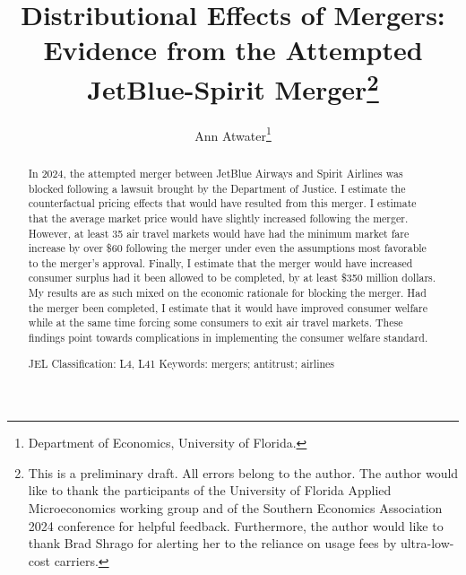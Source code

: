 \documentclass{article}
\author{Ann Atwater\footnote{Department of Economics, University of Florida.}}
\title{Distributional Effects of Mergers: Evidence from the Attempted JetBlue-Spirit Merger\footnote{This is a preliminary draft. All errors belong to the author. The author would like to thank the participants of the University of Florida Applied Microeconomics working group and of the Southern Economics Association 2024 conference for helpful feedback. Furthermore, the author would like to thank Brad Shrago for alerting her to the reliance on usage fees by ultra-low-cost carriers. }}
\begin{document}
	\maketitle
	
	\begin{abstract}
In 2024, the attempted merger between JetBlue Airways and Spirit Airlines was blocked following a lawsuit brought by the Department of Justice. I estimate the counterfactual pricing effects that would have resulted from this merger. I estimate that the average market price would have slightly increased following the merger. However, at least 35 air travel markets would have had the minimum market fare increase by over \$60 following the merger under even the assumptions most favorable to the merger's approval. Finally, I estimate that the merger would have increased consumer surplus had it been allowed to be completed, by at least \$350 million dollars. My results are as such mixed on the economic rationale for blocking the merger. Had the merger been completed, I estimate that it would have improved consumer welfare while at the same time forcing some consumers to exit air travel markets. These findings point towards complications in implementing the consumer welfare standard. \bigskip 

    \noindent JEL Classification: L4, L41 \newline
	\noindent Keywords: mergers; antitrust; airlines
		
	\end{abstract}
	
	\pagebreak
	
	\doublespacing
	
\end{document}
